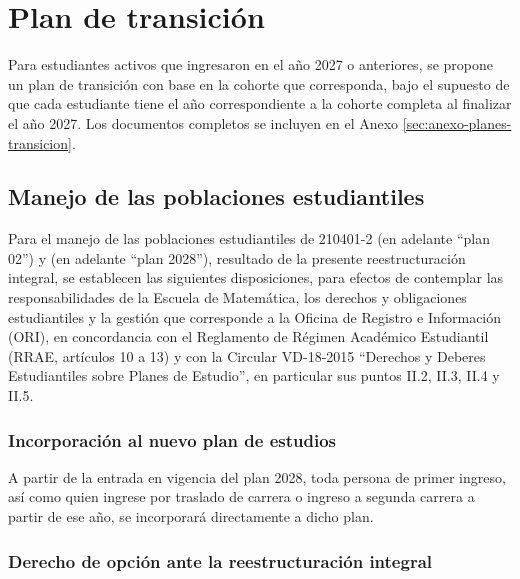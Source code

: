 \section{Plan de transición}
Para estudiantes activos que ingresaron en el año 2027 o anteriores, se propone un plan de transición con base en la cohorte que corresponda, bajo el supuesto de que cada estudiante tiene el año correspondiente a la cohorte completa al finalizar el año 2027. Los documentos completos se incluyen en el Anexo \ref{sec:anexo-planes-transicion}.

\subsection{Manejo de las poblaciones estudiantiles}
\label{sec:manejo-poblaciones}

Para el manejo de las poblaciones estudiantiles de  210401-2  (en adelante ``plan 02'') y   (en adelante ``plan 2028''), resultado de la presente reestructuración integral, se establecen las siguientes disposiciones, para efectos de contemplar las responsabilidades de la Escuela de Matemática, los derechos y obligaciones estudiantiles y la gestión que corresponde a la Oficina de Registro e Información (ORI), en concordancia con el Reglamento de Régimen Académico Estudiantil (RRAE, artículos 10 a 13) y con la Circular VD-18-2015 ``Derechos y Deberes Estudiantiles sobre Planes de Estudio'', en particular sus puntos II.2, II.3, II.4 y II.5.

\subsubsection{Incorporación al nuevo plan de estudios}

A partir de la entrada en vigencia del plan 2028, toda persona de primer ingreso, así como quien ingrese por traslado de carrera o ingreso a segunda carrera a partir de ese año, se incorporará directamente a dicho plan. 

\subsubsection{Derecho de opción ante la reestructuración integral}

